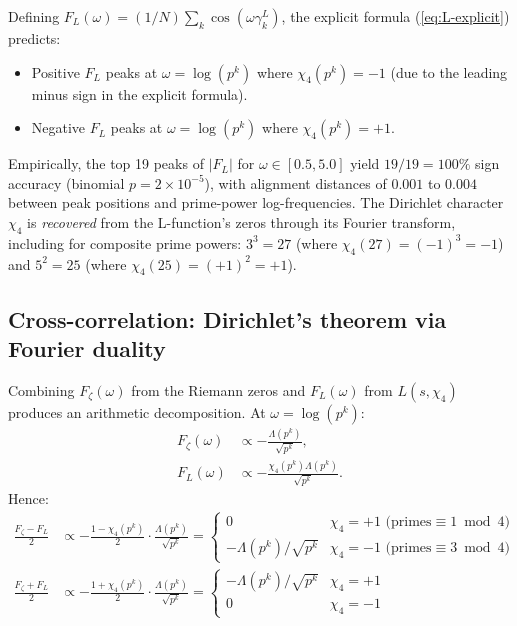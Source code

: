\documentclass[11pt,a4paper]{article}
\theoremstyle{plain}
\theoremstyle{definition}
\theoremstyle{remark}
\begin{document}
Defining $F_L(\omega) = (1/N) \sum_k \cos(\omega \gamma_k^L)$, the
explicit formula (\ref{eq:L-explicit}) predicts:
\begin{itemize}
\item Positive $F_L$ peaks at $\omega = \log(p^k)$ where $\chi_4(p^k) = -1$
(due to the leading minus sign in the explicit formula).
\item Negative $F_L$ peaks at $\omega = \log(p^k)$ where $\chi_4(p^k) = +1$.
\end{itemize}

Empirically, the top 19 peaks of $|F_L|$ for $\omega \in [0.5, 5.0]$
yield $19/19 = 100\%$ sign accuracy (binomial $p = 2 \times 10^{-5}$),
with alignment distances of $0.001$ to $0.004$ between peak positions
and prime-power log-frequencies. The Dirichlet character $\chi_4$ is
\emph{recovered} from the L-function's zeros through its Fourier transform,
including for composite prime powers: $3^3 = 27$ (where
$\chi_4(27) = (-1)^3 = -1$) and $5^2 = 25$ (where $\chi_4(25) = (+1)^2 = +1$).

\subsection{Cross-correlation: Dirichlet's theorem via Fourier duality}
\label{sec:dirichlet-theorem}

Combining $F_\zeta(\omega)$ from the Riemann zeros and $F_L(\omega)$
from $L(s, \chi_4)$ produces an arithmetic decomposition. At
$\omega = \log(p^k)$:
\begin{align}
  F_\zeta(\omega) &\propto -\frac{\Lambda(p^k)}{\sqrt{p^k}}, \\
  F_L(\omega) &\propto -\frac{\chi_4(p^k)\Lambda(p^k)}{\sqrt{p^k}}.
\end{align}
Hence:
\begin{align}
  \frac{F_\zeta - F_L}{2} &\propto -\frac{1 - \chi_4(p^k)}{2}
  \cdot \frac{\Lambda(p^k)}{\sqrt{p^k}}
  = \begin{cases} 0 & \chi_4 = +1 \text{ (primes} \equiv 1 \bmod 4) \\
  -\Lambda(p^k)/\sqrt{p^k} & \chi_4 = -1 \text{ (primes} \equiv 3 \bmod 4) \end{cases} \\
  \frac{F_\zeta + F_L}{2} &\propto -\frac{1 + \chi_4(p^k)}{2}
  \cdot \frac{\Lambda(p^k)}{\sqrt{p^k}}
  = \begin{cases} -\Lambda(p^k)/\sqrt{p^k} & \chi_4 = +1 \\
  0 & \chi_4 = -1 \end{cases}
\end{align}
\end{document}

